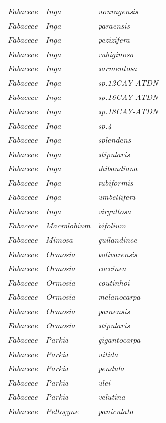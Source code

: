 \documentclass[fleqn,10pt]{ArtEcoFoG} %
\renewenvironment{table}{\begin{table*}}{\end{table*}\ignorespacesafterend}
\begin{document}
\begin{table}
\begin{tabular}[t]{lll}
\addlinespace
\em{Fabaceae} & \em{Inga} & \em{nouragensis}\\
\em{Fabaceae} & \em{Inga} & \em{paraensis}\\
\em{Fabaceae} & \em{Inga} & \em{pezizifera}\\
\em{Fabaceae} & \em{Inga} & \em{rubiginosa}\\
\em{Fabaceae} & \em{Inga} & \em{sarmentosa}\\
\addlinespace
\em{Fabaceae} & \em{Inga} & \em{sp.12CAY-ATDN}\\
\em{Fabaceae} & \em{Inga} & \em{sp.16CAY-ATDN}\\
\em{Fabaceae} & \em{Inga} & \em{sp.18CAY-ATDN}\\
\em{Fabaceae} & \em{Inga} & \em{sp.4}\\
\em{Fabaceae} & \em{Inga} & \em{splendens}\\
\addlinespace
\em{Fabaceae} & \em{Inga} & \em{stipularis}\\
\em{Fabaceae} & \em{Inga} & \em{thibaudiana}\\
\em{Fabaceae} & \em{Inga} & \em{tubiformis}\\
\em{Fabaceae} & \em{Inga} & \em{umbellifera}\\
\em{Fabaceae} & \em{Inga} & \em{virgultosa}\\
\addlinespace
\em{Fabaceae} & \em{Macrolobium} & \em{bifolium}\\
\em{Fabaceae} & \em{Mimosa} & \em{guilandinae}\\
\em{Fabaceae} & \em{Ormosia} & \em{bolivarensis}\\
\em{Fabaceae} & \em{Ormosia} & \em{coccinea}\\
\em{Fabaceae} & \em{Ormosia} & \em{coutinhoi}\\
\addlinespace
\em{Fabaceae} & \em{Ormosia} & \em{melanocarpa}\\
\em{Fabaceae} & \em{Ormosia} & \em{paraensis}\\
\em{Fabaceae} & \em{Ormosia} & \em{stipularis}\\
\em{Fabaceae} & \em{Parkia} & \em{gigantocarpa}\\
\em{Fabaceae} & \em{Parkia} & \em{nitida}\\
\addlinespace
\em{Fabaceae} & \em{Parkia} & \em{pendula}\\
\em{Fabaceae} & \em{Parkia} & \em{ulei}\\
\em{Fabaceae} & \em{Parkia} & \em{velutina}\\
\em{Fabaceae} & \em{Peltogyne} & \em{paniculata}\\

\end{tabular}
\end{table}
\end{document}
